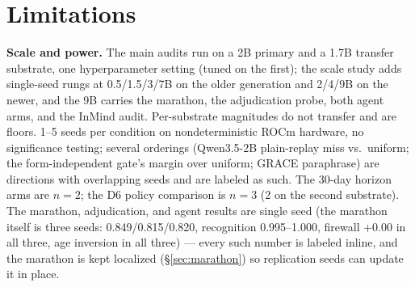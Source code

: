 \documentclass[11pt]{article}
\newcommand{\qwen}{Qwen3.5-2B}
\begin{document}
\section{Limitations}\label{sec:limits}

\textbf{Scale and power.} The main audits run on a 2B primary and a 1.7B transfer substrate,
one hyperparameter setting (tuned on the first); the scale study adds single-seed rungs at
0.5/1.5/3/7B on the older generation and 2/4/9B on the newer, and the 9B carries the marathon,
the adjudication probe, both agent arms, and the InMind audit. Per-substrate magnitudes do not transfer and are
floors. 1--5 seeds per condition on
nondeterministic ROCm hardware, no significance testing; several orderings (\qwen{} plain-replay
miss vs.\ uniform; the form-independent gate's margin over uniform; GRACE paraphrase) are
directions with overlapping seeds and are labeled as such. The 30-day horizon arms are $n{=}2$;
the D6 policy comparison is $n{=}3$ (2 on the second substrate). The marathon, adjudication,
and agent results are single seed (the marathon itself is three seeds: 0.849/0.815/0.820, recognition 0.995--1.000, firewall +0.00 in all three, age inversion in all three) --- every such number is labeled inline, and the marathon is
kept localized (\S\ref{sec:marathon}) so replication seeds can update it in place.
\end{document}
